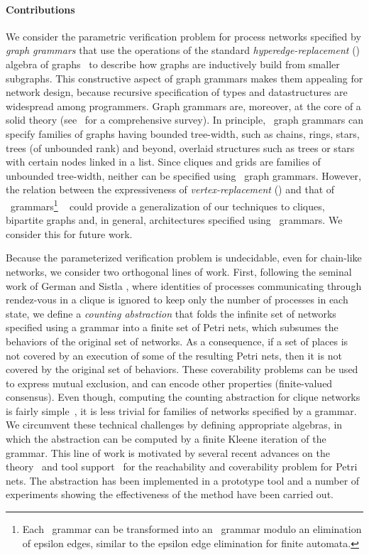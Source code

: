 \vspace*{-.5\baselineskip}
\paragraph{Contributions} We consider the parametric verification problem
for process networks specified by \emph{graph grammars} that use
the operations of the standard \emph{hyperedge-replacement} (\hrtext)
algebra of graphs~\cite{courcelle_engelfriet_2012} to describe how
graphs are inductively build from smaller subgraphs. This constructive
aspect of graph grammars makes them appealing for network design,
because recursive specification of types and datastructures are
widespread among programmers. Graph grammars are, moreover, at the
core of a solid theory (see~\cite{courcelle_engelfriet_2012} for a
comprehensive survey). In principle, \hrtext\ graph grammars can
specify families of graphs having bounded tree-width, such as chains,
rings, stars, trees (of unbounded rank) and beyond, \eg overlaid
structures such as trees or stars with certain nodes linked in a
list. Since cliques and grids are families of unbounded tree-width,
neither can be specified using \hrtext\ graph grammars.
\ifLongVersion However, the relation between the expressiveness of
\emph{vertex-replacement} (\vrtext) and that of
\hrtext\ grammars\footnote{Each \vrtext\ grammar can be transformed
  into an \hrtext\ grammar modulo an elimination of epsilon edges,
  similar to the epsilon edge elimination for finite automata.}
~\cite{COURCELLE1995275} could provide a generalization of our
techniques to cliques, bipartite graphs and, in general, architectures
specified using \vrtext\ grammars. We consider this for future
work. \fi

Because the parameterized verification problem is undecidable, even
for chain-like networks, we consider two orthogonal lines of
work. First, following the seminal work of German and Sistla
\cite{GermanSistla92}, where identities of processes communicating
through rendez-vous in a clique is ignored to keep only the number of
processes in each state, we define a \emph{counting abstraction} that
folds the infinite set of networks specified using a \hrtext{} grammar
into a finite set of Petri nets, which subsumes the behaviors of the
original set of networks. As a consequence, if a set of places is not
covered by an execution of some of the resulting Petri nets, then it
is not covered by the original set of behaviors. These coverability
problems can be used to express mutual exclusion, and can encode other
properties (\eg finite-valued consensus). Even though, computing the
counting abstraction for clique networks is fairly
simple~\cite{GermanSistla92}, it is less trivial for families of
networks specified by a grammar. We circumvent these technical
challenges by defining appropriate \hrtext{} algebras, in which the
abstraction can be computed by a finite Kleene iteration of the
grammar. This line of work is motivated by several recent advances on
the theory~\cite{DBLP:journals/sosym/FinkelL15} and tool
support~\cite{DBLP:conf/apn/Wolf18a} for the reachability and
coverability problem for Petri nets. The abstraction has been
implemented in a prototype tool and a number of experiments showing
the effectiveness of the method have been carried out.

